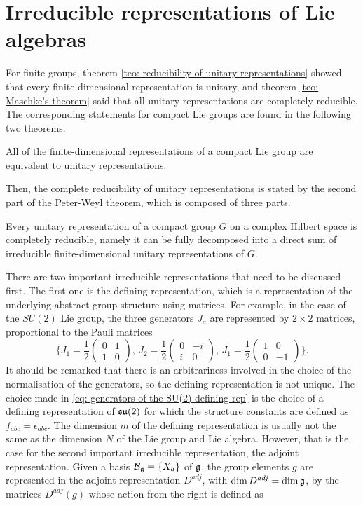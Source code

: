 \section{Irreducible representations of Lie algebras}
For finite groups, theorem \ref{teo: reducibility of unitary representations} showed that every finite-dimensional representation is unitary, and theorem \ref{teo: Maschke's theorem} said that all unitary representations are completely reducible. The corresponding statements for compact Lie groups are found in the following two theorems.
\begin{teo}
    All of the finite-dimensional representations of a compact Lie group are equivalent to unitary representations.
\end{teo}
Then, the complete reducibility of unitary representations is stated by the second part of the Peter-Weyl theorem, which is composed of three parts.
\begin{teo}
    Every unitary representation of a compact group $G$ on a complex Hilbert space is completely reducible, namely it can be fully decomposed into a direct sum of irreducible finite-dimensional unitary representations of $G$.
\end{teo}
There are two important irreducible representations that need to be discussed first. The first one is the defining representation, which is a representation of the underlying abstract group structure using matrices. For example, in the case of the $SU(2)$ Lie group, the three generators $J_a$ are represented by $2 \times 2$ matrices, proportional to the Pauli matrices
\begin{equation}
\label{eq: generators of the SU(2) defining rep}
    \bigg\{J_1 = \frac{1}{2}
    \begin{pmatrix}
        0 & 1 \\
        1 & 0
    \end{pmatrix},\,
    J_2 = \frac{1}{2}
    \begin{pmatrix}
        0 & -i \\
        i & 0
    \end{pmatrix},\,
    J_1 = \frac{1}{2}
    \begin{pmatrix}
        1 & 0 \\
        0 & -1
    \end{pmatrix}\bigg\}.
\end{equation}
It should be remarked that there is an arbitrariness involved in the choice of the normalisation of the generators, so the defining representation is not unique. The choice made in \eqref{eq: generators of the SU(2) defining rep} is the choice of a defining representation of $\mathfrak{su}(2)$ for which the structure constants are defined as $f_{abc} = \epsilon_{abc}$. The dimension $m$ of the defining representation is usually not the same as the dimension $N$ of the Lie group and Lie algebra. However, that is the case for the second important irreducible representation, the adjoint representation. Given a basis $\mathcal{B}_{\mathfrak{g}} = \{X_a\}$ of $\mathfrak{g}$, the group elements $g$ are represented in the adjoint representation $D^{adj}$, with $\dim{D^{adj}} = \dim{\mathfrak{g}}$, by the matrices $D^{adj}(g)$ whose action from the right is defined as
